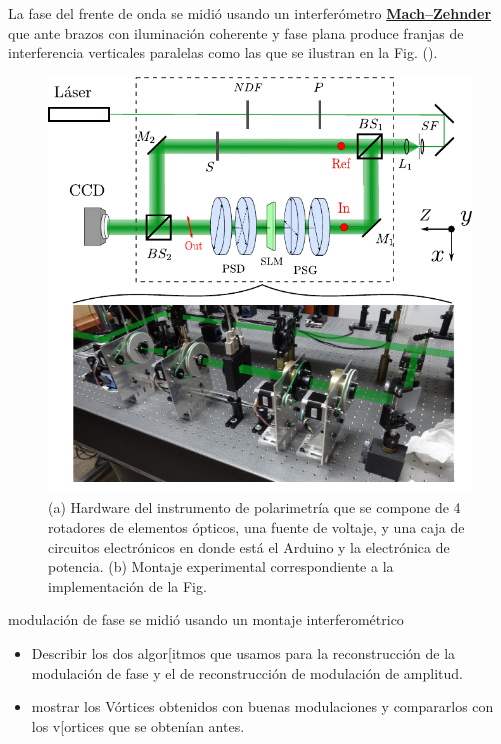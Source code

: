 La fase del frente de onda se midió usando un interferómetro
\href{http://en.wikipedia.org/wiki/Mach–Zehnder_interferometer}{\bf{Mach–Zehnder}}
que ante brazos con iluminación coherente y fase plana produce franjas
de interferencia verticales paralelas como las que se ilustran en la Fig. (). 

\begin{figure}[h!]
\centering
\includegraphics[scale=1.1]{mach_zehnder.pdf}
\caption[Hardware del instrumento de polarimetría y montaje
experimental ]{(a) Hardware del instrumento de polarimetría que se
  compone de 4 rotadores de elementos ópticos, una fuente de voltaje,
  y una caja de circuitos electrónicos en donde está el Arduino y la
  electrónica de potencia. (b) Montaje experimental correspondiente a
  la implementación de la Fig. }
\label{fig:mach_zehnder}
\end{figure}

modulación de fase se midió usando un montaje interferométrico 

\begin{itemize}
\item Describir los dos algor[itmos que usamos para la reconstrucción
  de la modulación de fase y el de reconstrucción de modulación de
  amplitud. 
\item mostrar los Vórtices obtenidos con buenas modulaciones y
  compararlos con los v[ortices que se obtenían antes.
\end{itemize}
\newpage
\pagebreak[4]
